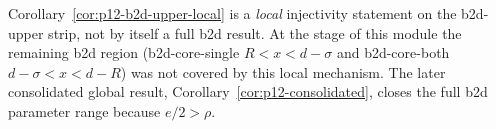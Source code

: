 \begin{remark}[Scope]
\label{rem:p12-b2d-upper-scope}
Corollary~\ref{cor:p12-b2d-upper-local} is a \emph{local}
injectivity statement on the b2d-upper strip, not by itself a full b2d
result.  At the stage of this module the remaining b2d region
(b2d-core-single $R < x < d - \sigma$ and b2d-core-both
$d - \sigma < x < d - R$) was not covered by this local mechanism.
The later consolidated global result, Corollary~\ref{cor:p12-consolidated},
closes the full b2d parameter range because $e/2>\rho$.
\end{remark}
